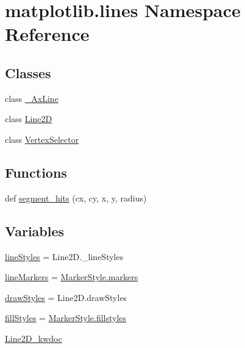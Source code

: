 \hypertarget{namespacematplotlib_1_1lines}{}\section{matplotlib.\+lines Namespace Reference}
\label{namespacematplotlib_1_1lines}
\subsection*{Classes}
\begin{DoxyCompactItemize}
\item 
class \hyperlink{classmatplotlib_1_1lines_1_1__AxLine}{\+\_\+\+Ax\+Line}
\item 
class \hyperlink{classmatplotlib_1_1lines_1_1Line2D}{Line2D}
\item 
class \hyperlink{classmatplotlib_1_1lines_1_1VertexSelector}{Vertex\+Selector}
\end{DoxyCompactItemize}
\subsection*{Functions}
\begin{DoxyCompactItemize}
\item 
def \hyperlink{namespacematplotlib_1_1lines_ad86bcef38ede8b80544d1c22c138a672}{segment\+\_\+hits} (cx, cy, x, y, radius)
\end{DoxyCompactItemize}
\subsection*{Variables}
\begin{DoxyCompactItemize}
\item 
\hyperlink{namespacematplotlib_1_1lines_aeb377648cd8e78fd8655f1244695391b}{line\+Styles} = Line2\+D.\+\_\+line\+Styles
\item 
\hyperlink{namespacematplotlib_1_1lines_acb26f6a7a1681777012923f5bccd5f5f}{line\+Markers} = \hyperlink{classmatplotlib_1_1markers_1_1MarkerStyle_a0ddfb9c88144670b3551f8b36c07fab1}{Marker\+Style.\+markers}
\item 
\hyperlink{namespacematplotlib_1_1lines_a283b190204417ecb18408db460222965}{draw\+Styles} = Line2\+D.\+draw\+Styles
\item 
\hyperlink{namespacematplotlib_1_1lines_a4274d9034164f1fa3da87edfe32d6eb2}{fill\+Styles} = \hyperlink{classmatplotlib_1_1markers_1_1MarkerStyle_afdd2d6b5d2416a69e548989c2b518da4}{Marker\+Style.\+fillstyles}
\item 
\hyperlink{namespacematplotlib_1_1lines_a970908ace31c07a8b095c34d5113b71d}{Line2\+D\+\_\+kwdoc}
\end{DoxyCompactItemize}


